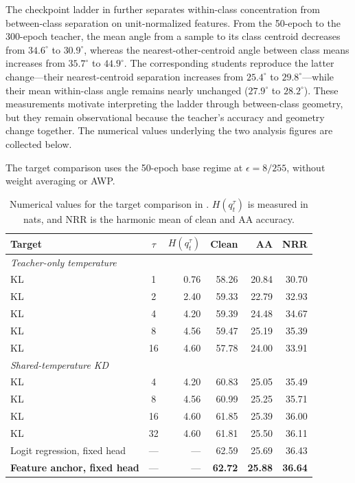The checkpoint ladder in  further separates within-class concentration from
between-class separation on unit-normalized features. From the 50-epoch to the 300-epoch teacher,
the mean angle from a sample to its class centroid decreases from $34.6^\circ$ to $30.9^\circ$,
whereas the nearest-other-centroid angle between class means increases from $35.7^\circ$ to $44.9^\circ$. The
corresponding students reproduce the latter change---their nearest-centroid separation increases from
$25.4^\circ$ to $29.8^\circ$---while their mean within-class angle remains nearly unchanged
($27.9^\circ$ to $28.2^\circ$). These measurements motivate interpreting the ladder through
between-class geometry, but they remain observational because the teacher's accuracy and geometry
change together. The numerical values underlying the two analysis figures are collected below.

The target comparison uses the 50-epoch base regime at $\epsilon=8/255$, without weight averaging
or AWP.

\begin{table}[!htbp]
  \centering \small \setlength{\tabcolsep}{4pt}
  \caption{Numerical values for the target comparison in .
  $H(q_t^\tau)$ is measured in nats, and NRR is the harmonic mean of clean and AA accuracy.}
  \label{tab:targetcomparison_values}
  \begin{tabular}{lcrrrr}
    \toprule
    Target & $\tau$ & $H(q_t^\tau)$ & Clean & AA & NRR \\
    \midrule
    \multicolumn{6}{l}{\emph{Teacher-only temperature}} \\
    KL & 1  & 0.76 & 58.26 & 20.84 & 30.70 \\
    KL & 2  & 2.40 & 59.33 & 22.79 & 32.93 \\
    KL & 4  & 4.20 & 59.39 & 24.48 & 34.67 \\
    KL & 8  & 4.56 & 59.47 & 25.19 & 35.39 \\
    KL & 16 & 4.60 & 57.78 & 24.00 & 33.91 \\
    \midrule
    \multicolumn{6}{l}{\emph{Shared-temperature KD}} \\
    KL & 4  & 4.20 & 60.83 & 25.05 & 35.49 \\
    KL & 8  & 4.56 & 60.99 & 25.25 & 35.71 \\
    KL & 16 & 4.60 & 61.85 & 25.39 & 36.00 \\
    KL & 32 & 4.60 & 61.81 & 25.50 & 36.11 \\
    \midrule
    Logit regression, fixed head  & --- & --- & 62.59 & 25.69 & 36.43 \\
    \textbf{Feature anchor, fixed head} & --- & --- & \textbf{62.72} & \textbf{25.88} & \textbf{36.64} \\
    \bottomrule
  \end{tabular}
\end{table}

